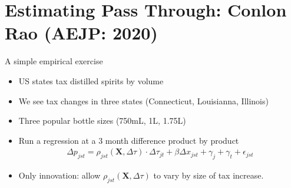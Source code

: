 \section{Estimating Pass Through: Conlon Rao (AEJP: 2020)}

\begin{frame}{A simple empirical exercise}
\begin{itemize}
\item US states tax distilled spirits by volume
\item We see tax changes in three states (Connecticut, Louisianna, Illinois)
\item Three popular bottle sizes (750mL, 1L, 1.75L)
\item Run a regression at a 3 month difference product by product
\begin{align*}
\Delta p_{j s t}=\rho_{j s t}(\mathbf{X}, \Delta \tau) \cdot \Delta \tau_{j t}+\beta \Delta x_{j s t}+\gamma_j+\gamma_t+\epsilon_{j s t}
\end{align*}
\item Only innovation: allow $\rho_{j s t}(\mathbf{X}, \Delta \tau) $ to vary by size of tax increase.
\end{itemize}
\end{frame}


